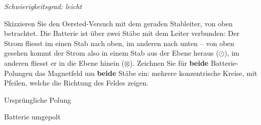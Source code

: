 \documentclass[addpoints,11pt,a4paper]{exam}
\newcommand{\Schwierigkeit}[1]{%
  \textit{\color{darkgray}Schwierigkeitsgrad: #1}\par\smallskip
}
\begin{document}
\begin{questions}
\begin{taskbox}
\Schwierigkeit{leicht}
\question[4] Skizzieren Sie den Oersted-Versuch mit dem geraden
Stableiter, von oben betrachtet. Die Batterie ist über zwei Stäbe mit
dem Leiter verbunden: Der Strom fliesst im einen Stab nach oben, im
anderen nach unten -- von oben gesehen kommt der Strom also in einem
Stab aus der Ebene heraus ($\odot$), im anderen fliesst er in die Ebene
hinein ($\otimes$). Zeichnen Sie für \textbf{beide} Batterie-Polungen
das Magnetfeld um \textbf{beide} Stäbe ein: mehrere konzentrische
Kreise, mit Pfeilen, welche die Richtung des Feldes zeigen.
\begin{center}
\begin{minipage}[t]{7.6cm}\centering
\footnotesize Ursprüngliche Polung\\[1mm]
\begin{answerbox}
\vspace{1.8cm}
\begin{center}
\end{center}
\vspace{1.8cm}
\end{answerbox}
\end{minipage}\hfill
\begin{minipage}[t]{7.6cm}\centering
\footnotesize Batterie umgepolt\\[1mm]
\begin{answerbox}
\vspace{1.8cm}
\begin{center}
\end{center}
\end{answerbox}
\end{minipage}
\end{center}
\end{taskbox}
\end{questions}
\end{document}
